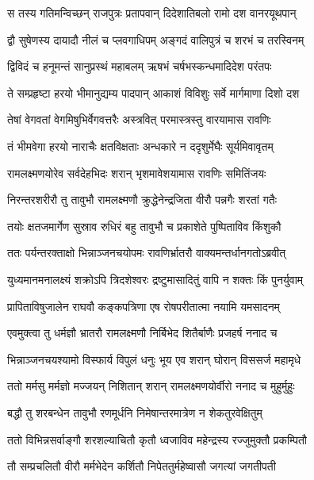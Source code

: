 
\twolineshloka
{स तस्य गतिमन्विच्छन् राजपुत्रः प्रतापवान्}
{दिदेशातिबलो रामो दश वानरयूथपान्} %

\twolineshloka
{द्वौ सुषेणस्य दायादौ नीलं च प्लवगाधिपम्}
{अङ्गदं वालिपुत्रं च शरभं च तरस्विनम्} %

\twolineshloka
{द्विविदं च हनूमन्तं सानुप्रस्थं महाबलम्}
{ऋषभं चर्षभस्कन्धमादिदेश परंतपः} %

\twolineshloka
{ते सम्प्रहृष्टा हरयो भीमानुद्यम्य पादपान्}
{आकाशं विविशुः सर्वे मार्गमाणा दिशो दश} %

\twolineshloka
{तेषां वेगवतां वेगमिषुभिर्वेगवत्तरैः}
{अस्त्रवित् परमास्त्रस्तु वारयामास रावणिः} %

\twolineshloka
{तं भीमवेगा हरयो नाराचैः क्षतविक्षताः}
{अन्धकारे न ददृशुर्मेघैः सूर्यमिवावृतम्} %

\twolineshloka
{रामलक्ष्मणयोरेव सर्वदेहभिदः शरान्}
{भृशमावेशयामास रावणिः समितिंजयः} %

\twolineshloka
{निरन्तरशरीरौ तु तावुभौ रामलक्ष्मणौ}
{क्रुद्धेनेन्द्रजिता वीरौ पन्नगैः शरतां गतैः} %

\twolineshloka
{तयोः क्षतजमार्गेण सुस्राव रुधिरं बहु}
{तावुभौ च प्रकाशेते पुष्पिताविव किंशुकौ} %

\twolineshloka
{ततः पर्यन्तरक्ताक्षो भिन्नाञ्जनचयोपमः}
{रावणिर्भ्रातरौ वाक्यमन्तर्धानगतोऽब्रवीत्} %

\twolineshloka
{युध्यमानमनालक्ष्यं शक्रोऽपि त्रिदशेश्वरः}
{द्रष्टुमासादितुं वापि न शक्तः किं पुनर्युवाम्} %

\twolineshloka
{प्रापिताविषुजालेन राघवौ कङ्कपत्रिणा}
{एष रोषपरीतात्मा नयामि यमसादनम्} %

\twolineshloka
{एवमुक्त्वा तु धर्मज्ञौ भ्रातरौ रामलक्ष्मणौ}
{निर्बिभेद शितैर्बाणैः प्रजहर्ष ननाद च} %

\twolineshloka
{भिन्नाञ्जनचयश्यामो विस्फार्य विपुलं धनुः}
{भूय एव शरान् घोरान् विससर्ज महामृधे} %

\twolineshloka
{ततो मर्मसु मर्मज्ञो मज्जयन् निशितान् शरान्}
{रामलक्ष्मणयोर्वीरो ननाद च मुहुर्मुहुः} %

\twolineshloka
{बद्धौ तु शरबन्धेन तावुभौ रणमूर्धनि}
{निमेषान्तरमात्रेण न शेकतुरवेक्षितुम्} %

\twolineshloka
{ततो विभिन्नसर्वाङ्गौ शरशल्याचितौ कृतौ}
{ध्वजाविव महेन्द्रस्य रज्जुमुक्तौ प्रकम्पितौ} %

\twolineshloka
{तौ सम्प्रचलितौ वीरौ मर्मभेदेन कर्शितौ}
{निपेततुर्महेष्वासौ जगत्यां जगतीपती} %

